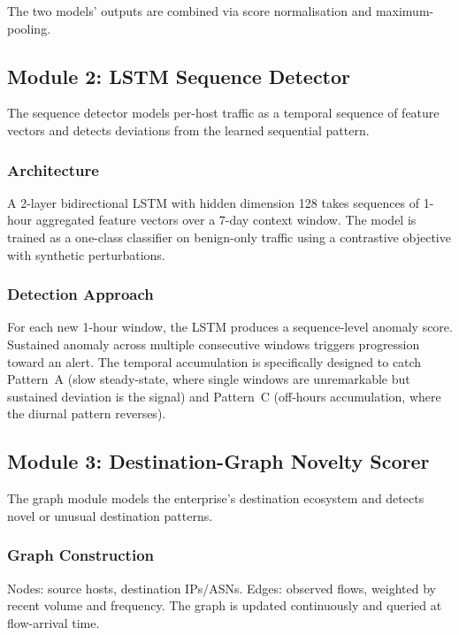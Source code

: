 \documentclass[sigconf,nonacm]{acmart}
\begin{document}
The two models' outputs are combined via score normalisation and
maximum-pooling.

\subsection{Module 2: LSTM Sequence Detector}

The sequence detector models per-host traffic as a temporal sequence
of feature vectors and detects deviations from the learned sequential
pattern.

\subsubsection{Architecture}

A 2-layer bidirectional LSTM with hidden dimension 128 takes sequences
of 1-hour aggregated feature vectors over a 7-day context window. The
model is trained as a one-class classifier on benign-only traffic
using a contrastive objective with synthetic perturbations.

\subsubsection{Detection Approach}

For each new 1-hour window, the LSTM produces a sequence-level
anomaly score. Sustained anomaly across multiple consecutive windows
triggers progression toward an alert. The temporal accumulation is
specifically designed to catch Pattern~A (slow steady-state, where
single windows are unremarkable but sustained deviation is the
signal) and Pattern~C (off-hours accumulation, where the diurnal
pattern reverses).

\subsection{Module 3: Destination-Graph Novelty Scorer}

The graph module models the enterprise's destination ecosystem and
detects novel or unusual destination patterns.

\subsubsection{Graph Construction}

Nodes: source hosts, destination IPs/ASNs.
Edges: observed flows, weighted by recent volume and frequency.
The graph is updated continuously and queried at flow-arrival time.
\end{document}
